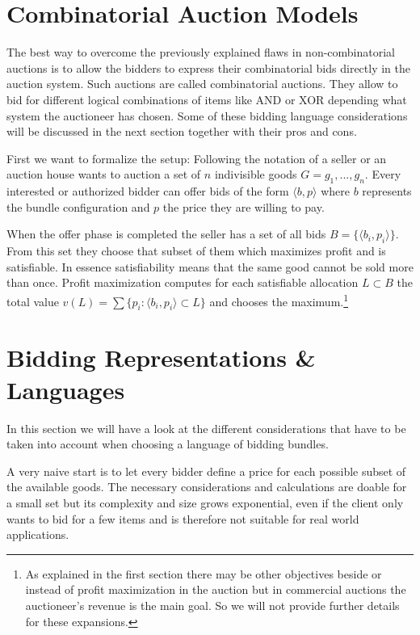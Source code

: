 \documentclass[a4paper]{paper}
\begin{document}
\section{Combinatorial Auction Models}

The best way to overcome the previously explained flaws in non-combinatorial auctions is to allow the bidders to express their combinatorial bids directly in the auction system. Such auctions are called combinatorial auctions. They allow to bid for different logical combinations of items like AND or XOR depending what system the auctioneer has chosen. Some of these bidding language considerations will be discussed in the next section together with their pros and cons.

First we want to formalize the setup: Following the notation of \cite[chapter~2]{BH01} a seller or an auction house wants to auction a set of $n$ indivisible goods $G = {g_1, ..., g_n}$. Every interested or authorized bidder can offer bids of the form $\langle b, p \rangle$ where $b$ represents the bundle configuration and $p$ the price they are willing to pay.

When the offer phase is completed the seller has a set of all bids $B = \{\langle b_i, p_i \rangle\}$. From this set they choose that subset of them which maximizes profit and is satisfiable. In essence satisfiability means that the same good cannot be sold more than once. Profit maximization computes for each satisfiable allocation $L \subset B$ the total value $v(L) = \sum \{p_i : \langle b_i, p_i \rangle  \subset L\}$ and chooses the maximum.\footnote{As explained in the first section there may be other objectives beside or instead of profit maximization in the auction but in commercial auctions the auctioneer's revenue is the main goal. So we will not provide further details for these expansions.}

\section{Bidding Representations \& Languages}

In this section we will have a look at the different considerations that have to be taken into account when choosing a language of bidding bundles. 

A very naive start is to let every bidder define a price for each possible subset of the available goods. The necessary considerations and calculations are doable for a small set but its complexity and size grows exponential, even if the client only wants to bid for a few items and is therefore not suitable for real world applications.
\end{document}
